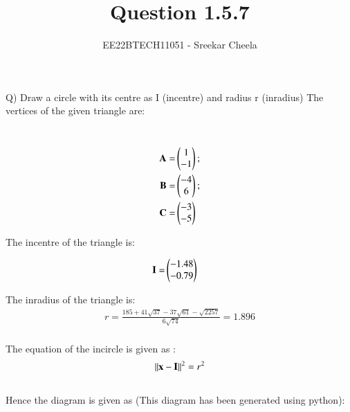 \documentclass[journal,12pt,twocolumn]{IEEEtran}
\theoremstyle{remark}
\begin{document}
%




\vspace{3cm}

\title{
Question 1.5.7
}
\author{ EE22BTECH11051 - Sreekar Cheela 
}	

\maketitle

\newpage


\begin{flushleft}
	\large Q) Draw a circle with its centre as I (incentre) and radius r (inradius)
	\bigskip
	\large The vertices of the given triangle are:
\end{flushleft}
\\
\begin{align}
	\mathbf {A}= &\begin{pmatrix}1\\-1\end{pmatrix};\\ \mathbf {B}= &\begin{pmatrix}-4\\6\end{pmatrix};\\ \mathbf {C}= &\begin{pmatrix}-3\\-5\end{pmatrix}
\end{align}

\begin{flushleft}
	\large The incentre of the triangle is:
\end{flushleft}

\begin{align}
	\mathbf{I}=&\begin{pmatrix}
		-1.48 \\
		-0.79\end{pmatrix}
\end{align}

\begin{flushleft}
    \large The inradius of the triangle is:
    \\
    \begin{align}
    r = \frac{185+41\sqrt{37}-37\sqrt{61}-\sqrt{2257}}{6\sqrt{74}} = 1.896\\
    \end{align}

	\large The equation of the incircle is given as :\\

	\begin{align}
		{
			\left\lVert\mathbf{x}-\mathbf{I}\right\rVert^2 = r^2
		}
	\end{align}
    \\Hence the diagram is given as (This diagram has been generated using python):
    \\
\end{flushleft}
\end{document}
